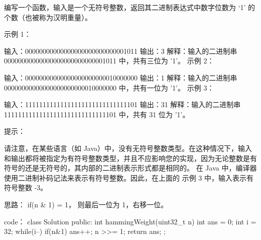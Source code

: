 编写一个函数，输入是一个无符号整数，返回其二进制表达式中数字位数为 ‘1’ 的个数（也被称为汉明重量）。

 

示例 1：

输入：00000000000000000000000000001011
输出：3
解释：输入的二进制串 00000000000000000000000000001011 中，共有三位为 '1'。
示例 2：

输入：00000000000000000000000010000000
输出：1
解释：输入的二进制串 00000000000000000000000010000000 中，共有一位为 '1'。
示例 3：

输入：11111111111111111111111111111101
输出：31
解释：输入的二进制串 11111111111111111111111111111101 中，共有 31 位为 '1'。
 

提示：

请注意，在某些语言（如 Java）中，没有无符号整数类型。在这种情况下，输入和输出都将被指定为有符号整数类型，并且不应影响您的实现，因为无论整数是有符号的还是无符号的，其内部的二进制表示形式都是相同的。
在 Java 中，编译器使用二进制补码记法来表示有符号整数。因此，在上面的 示例 3 中，输入表示有符号整数 -3。






















思路：
if(n & 1) = 1， 则最后一位为 1，右移一位。




















code：
class Solution {
public:
    int hammingWeight(uint32_t n) {
        int ans = 0;
        int i = 32;
        while(i--)
        {
            if(n&1)
                ans++;
            n >>= 1;
        }
        return ans;
    }
};